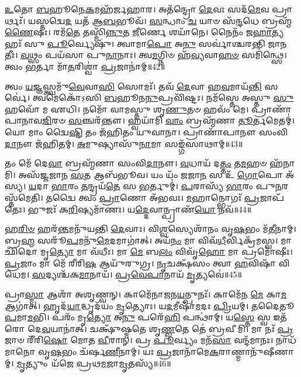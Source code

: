 \-\ul{𑌉}\-𑌤𑍋 \ul{𑌬}\-𑌹𑍂𑌨𑍇\-\ul{𑌕}\-𑌮𑌹᳴𑌰𑍍𑌜𑌹𑌾𑌰। 
𑌅𑌤᳴𑌨𑍍𑌦𑍍𑌰𑍋 \ul{𑌦𑍇}\-𑌵𑌃 𑌸𑌦᳴\-\ul{𑌮𑍇}\-𑌵 𑌪𑍍𑌰𑌾𑌰𑍍𑌥𑌃᳴। 
𑌯𑌸𑍍𑌤𑌦𑍍𑌵𑍇\-\ul{𑌦} 𑌯𑌤᳴ 𑌆\-\ul{𑌬}\-𑌭𑍂𑌵᳴। 
\-\ul{𑌸}\-𑌨𑍍𑌧𑌾𑌂 \ul{𑌚} 𑌯𑌾𑍞 𑌸᳴\-\ul{𑌨𑍍𑌦}\-𑌧𑍇 𑌬𑍍𑌰𑌹𑍍𑌮᳴\-\ul{𑌣𑍈}\-𑌷𑌃। 
𑌰𑌮᳴\-\ul{𑌤𑍇} 𑌤𑌸𑍍𑌮𑌿᳴\-\ul{𑌨𑍍𑌨𑍁}\-𑌤 \ul{𑌜𑍀}\-𑌰𑍍𑌣𑍇 𑌶𑌯𑌾᳴𑌨𑍇। 
𑌨𑍈𑌨𑌂᳴ 𑌜\-\ul{𑌹𑌾}\-𑌤𑍍𑌯𑌹𑌃᳴ 𑌸𑍁 \ul{𑌪𑍂}\-𑌰𑍍𑌵𑍍𑌯𑍇𑌷𑍁᳴। 
𑌤𑍍𑌵𑌾𑌮𑌾\-\ul{𑌪𑍋} 𑌅\-\ul{𑌨𑍁} 𑌸𑌰𑍍𑌵𑌾॑𑌶𑍍𑌚𑌰𑌨𑍍𑌤𑌿 𑌜𑌾\-\ul{𑌨}\-𑌤𑍀𑌃। 
\-\ul{𑌵}\-𑌥𑍍𑌸𑌂 𑌪𑌯᳴𑌸𑌾 𑌪𑍁\-\ul{𑌨𑌾}\-𑌨𑌾𑌃। 
𑌤𑍍𑌵\-\ul{𑌮}\-𑌗𑍍𑌨𑌿𑍞 𑌹᳴\-\ul{𑌵𑍍𑌯}\-𑌵𑌾\-\ul{𑌹}\-\-\ul{𑍞} 𑌸𑌮𑌿॑𑌨𑍍𑌥𑍍𑌸𑍇। 
𑌤𑍍𑌵𑌂 \ul{𑌭}\-𑌰𑍍𑌤𑌾 𑌮𑌾᳴\-\ul{𑌤}\-𑌰𑌿𑌶𑍍𑌵𑌾॑ \ul{𑌪𑍍𑌰}\-𑌜𑌾𑌨𑌾॑𑌮𑍍॥42॥

𑌤𑍍𑌵𑌂 \ul{𑌯}\-𑌜𑍍𑌞𑌸𑍍𑌤𑍍𑌵𑌮𑍁᳴\-\ul{𑌵𑍇}\-𑌵𑌾\-\ul{𑌸𑌿} 𑌸𑍋𑌮𑌃᳴। 
𑌤𑌵᳴ \ul{𑌦𑍇}\-𑌵𑌾 𑌹\-\ul{𑌵}\-𑌮𑌾𑌯᳴\-\ul{𑌨𑍍𑌤𑌿} 𑌸𑌰𑍍𑌵𑍇॑। 
𑌤𑍍𑌵𑌮𑍇𑌕𑍋᳴𑌽𑌸𑌿 \ul{𑌬}\-𑌹𑍂𑌨\-\ul{𑌨𑍁}\-𑌪𑍍𑌰𑌵𑌿᳴𑌷𑍍𑌟𑌃। 
𑌨𑌮᳴𑌸𑍍𑌤𑍇 𑌅𑌸𑍍𑌤𑍁 \ul{𑌸𑍁}\-𑌹𑌵𑍋᳴ 𑌮 𑌏𑌧𑌿। 
𑌨𑌮𑍋᳴ 𑌵𑌾𑌮𑌸𑍍𑌤𑍁 𑌶𑍃\-\ul{𑌣𑍁}\-𑌤𑍞 𑌹𑌵𑌂᳴ 𑌮𑍇। 
𑌪𑍍𑌰𑌾𑌣𑌾᳴𑌪𑌾𑌨𑌾𑌵\-\ul{𑌜𑌿}\-𑌰𑍞 \ul{𑌸}\-𑌞𑍍𑌚𑌰᳴𑌨𑍍𑌤𑍗। 
𑌹𑍍𑌵𑌯𑌾᳴𑌮𑌿 \ul{𑌵𑌾𑌂} 𑌬𑍍𑌰𑌹𑍍𑌮᳴𑌣𑌾 \ul{𑌤𑍂}\-𑌰𑍍𑌤𑌮𑍇𑌤𑌮𑍍॑। 
𑌯𑍋 𑌮𑌾𑌂 𑌦𑍍𑌵𑍇𑍇\-\ul{𑌷𑍍𑌟𑌿} 𑌤𑌂 𑌜᳴𑌹𑌿𑌤𑌂 𑌯𑍁𑌵𑌾𑌨𑌾। 
𑌪𑍍𑌰𑌾𑌣𑌾᳴𑌪𑌾𑌨𑍗 𑌸𑌂𑌵𑌿\-\ul{𑌦𑌾}\-𑌨𑍗 𑌜᳴𑌹𑌿𑌤𑌮𑍍। 
\-\ul{𑌅}\-𑌮𑍁𑌷𑍍𑌯𑌾𑌸𑍁᳴\-\ul{𑌨𑌾}\-𑌮𑌾 𑌸𑌙𑍍𑌗᳴𑌸𑌾𑌥𑌾𑌮𑍍॥43॥

𑌤𑌂 𑌮𑍇᳴ 𑌦𑍇\-\ul{𑌵𑌾} 𑌬𑍍𑌰𑌹𑍍𑌮᳴𑌣𑌾 𑌸𑌂𑌵𑌿\-\ul{𑌦𑌾}\-𑌨𑍗। 
\-\ul{𑌵}\-𑌧𑌾𑌯᳴ 𑌦\-\ul{𑌤𑍍𑌤𑌂} 𑌤\-\ul{𑌮}\-𑌹𑍞 𑌹᳴𑌨𑌾𑌮𑌿। 
𑌅𑌸᳴𑌜𑍍𑌜𑌜𑌾𑌨 \ul{𑌸}\-𑌤 𑌆𑌬᳴𑌭𑍂𑌵। 
𑌯𑌂 𑌯𑌂᳴ \ul{𑌜}\-𑌜𑌾\-\ul{𑌨} 𑌸 𑌉᳴ \ul{𑌗𑍋}\-𑌪𑍋 𑌅᳴𑌸𑍍𑌯। 
\-\ul{𑌯}\-𑌦𑌾 \ul{𑌭𑌾}\-𑌰𑌂 \ul{𑌤}\-𑌨𑍍𑌦𑍍𑌰𑌯᳴\-\ul{𑌤𑍇} 𑌸 𑌭𑌰𑍍𑌤𑍁𑌮𑍍॑। 
\-\ul{𑌪}\-𑌰𑌾𑌸𑍍𑌯᳴ \ul{𑌭𑌾}\-𑌰𑌂 𑌪𑍁\-\ul{𑌨}\-𑌰𑌸𑍍𑌤᳴𑌮𑍇𑌤𑌿। 
𑌤𑌦𑍍𑌵𑍈 𑌤𑍍𑌵𑌂 \ul{𑌪𑍍𑌰𑌾}\-𑌣𑍋 𑌅᳴𑌭𑌵𑌃। 
\-\ul{𑌮}\-𑌹𑌾𑌨𑍍𑌭𑍋𑌗𑌃᳴ \ul{𑌪𑍍𑌰}\-𑌜𑌾𑌪᳴𑌤𑍇𑌃। 
𑌭𑍁𑌜𑌃᳴ 𑌕\-\ul{𑌰𑌿}\-𑌷𑍍𑌯𑌮𑌾᳴𑌣𑌃। 
𑌯\-\ul{𑌦𑍍𑌦𑍇}\-𑌵𑌾𑌨𑍍𑌪𑍍𑌰𑌾𑌣᳴\-\ul{𑌯𑍋} 𑌨𑌵᳴॥44॥
\anuvakamend[𑌏𑌕𑌂᳴ \ul{𑌪𑍍𑌰}\-𑌜𑌾𑌨𑌾॑𑌙𑍍𑌗𑌸𑌾\-\ul{𑌥𑌾𑌂} 𑌨𑌵᳴]

𑌹\-\ul{𑌰𑌿}\-\-\ul{𑍞} 𑌹𑌰᳴\-\ul{𑌨𑍍𑌤}\-𑌮𑌨𑍁᳴𑌯𑌨𑍍𑌤𑌿 \ul{𑌦𑍇}\-𑌵𑌾𑌃। 
𑌵𑌿\-\ul{𑌶𑍍𑌵}\-𑌸𑍍𑌯𑍇𑌶𑌾᳴𑌨𑌂 𑌵𑍃\-\ul{𑌷}\-𑌭𑌂 𑌮᳴\-\ul{𑌤𑍀}\-𑌨𑌾𑌮𑍍। 
𑌬𑍍𑌰\-\ul{𑌹𑍍𑌮} 𑌸𑌰𑍂᳴\-\ul{𑌪}\-𑌮𑌨𑍁᳴\-\ul{𑌮𑍇}\-𑌦𑌮𑌾𑌗𑌾॑𑌤𑍍। 
𑌅𑌯᳴\-\ul{𑌨𑌂} 𑌮𑌾 𑌵𑌿𑌵᳴\-\ul{𑌧𑍀}\-𑌰𑍍𑌵𑌿𑌕𑍍𑌰᳴𑌮𑌸𑍍𑌵। 
𑌮𑌾 𑌛𑌿᳴𑌦𑍋 𑌮𑍃\-\ul{𑌤𑍍𑌯𑍋} 𑌮𑌾 𑌵᳴𑌧𑍀𑌃। 
𑌮𑌾 \ul{𑌮𑍇} 𑌬\-\ul{𑌲𑌂}  𑌵𑌿𑌵𑍃᳴\-\ul{𑌹𑍋} 𑌮𑌾 𑌪𑍍𑌰𑌮𑍋᳴𑌷𑍀𑌃। 
\-\ul{𑌪𑍍𑌰}\-𑌜𑌾𑌂 𑌮𑌾 𑌮𑍇᳴ 𑌰𑍀𑌰𑌿\-\ul{𑌷} 𑌆𑌯𑍁᳴𑌰𑍁𑌗𑍍𑌰। 
\-\ul{𑌨𑍃}\-𑌚𑌕𑍍𑌷᳴𑌸𑌂 𑌤𑍍𑌵𑌾 \ul{𑌹}\-𑌵𑌿𑌷𑌾᳴ 𑌵𑌿𑌧𑍇𑌮। 
\-\ul{𑌸}\-𑌦𑍍𑌯𑌶𑍍𑌚᳴𑌕\-\ul{𑌮𑌾}\-𑌨𑌾𑌯᳴। 
\-\ul{𑌪𑍍𑌰}\-\-\ul{𑌵𑍇}\-\-\ul{𑌪𑌾}\-𑌨𑌾𑌯᳴ \ul{𑌮𑍃}\-𑌤𑍍𑌯𑌵𑍇॑॥45॥

𑌪𑍍𑌰𑌾\-\ul{𑌸𑍍𑌮𑌾} 𑌆𑌶𑌾᳴ 𑌅𑌶𑍃𑌣𑍍𑌵𑌨𑍍। 
𑌕𑌾𑌮𑍇᳴𑌨𑌾𑌜𑌨\-\ul{𑌯}\-𑌨𑍍𑌪𑍁𑌨𑌃᳴। 
𑌕𑌾𑌮𑍇᳴𑌨 \ul{𑌮𑍇} 𑌕𑌾\-\ul{𑌮} 𑌆𑌗𑌾॑𑌤𑍍। 
𑌹𑍃𑌦᳴\-\ul{𑌯𑌾}\-𑌦𑍍𑌧𑍃𑌦᳴𑌯𑌂 \ul{𑌮𑍃}\-𑌤𑍍𑌯𑍋𑌃। 
𑌯\-\ul{𑌦}\-𑌮𑍀𑌷𑌾᳴\-\ul{𑌮}\-𑌦𑌃 \ul{𑌪𑍍𑌰𑌿}\-𑌯𑌮𑍍। 
𑌤𑌦𑍈𑌤𑍂\-\ul{𑌪}\-𑌮𑌾\-\ul{𑌮}\-𑌭𑌿। 
𑌪𑌰𑌂᳴ 𑌮𑍃\-\ul{𑌤𑍍𑌯𑍋} 𑌅\-\ul{𑌨𑍁} 𑌪𑌰𑍇᳴\-\ul{𑌹𑌿} 𑌪𑌨𑍍𑌥𑌾॑𑌮𑍍। 
𑌯\-\ul{𑌸𑍍𑌤𑍇} 𑌸𑍍𑌵 𑌇𑌤᳴𑌰𑍋 𑌦𑍇\-\ul{𑌵}\-𑌯𑌾𑌨𑌾॑𑌤𑍍। 
𑌚𑌕𑍍𑌷𑍁᳴𑌷𑍍𑌮𑌤𑍇 𑌶𑍃\-\ul{𑌣𑍍𑌵}\-𑌤𑍇 𑌤𑍇॑ 𑌬𑍍𑌰𑌵𑍀𑌮𑌿। 
𑌮𑌾 𑌨𑌃᳴ \ul{𑌪𑍍𑌰}\-𑌜𑌾𑍞 𑌰𑍀᳴𑌰𑌿\-\ul{𑌷𑍋} 𑌮𑍋𑌤 \ul{𑌵𑍀}\-𑌰𑌾𑌨𑍍। 
𑌪𑍍𑌰 \ul{𑌪𑍂}\-𑌰𑍍𑌵𑍍𑌯𑌂 𑌮𑌨᳴\-\ul{𑌸𑌾} 𑌵𑌨𑍍𑌦᳴𑌮𑌾𑌨𑌃। 
𑌨𑌾𑌧᳴𑌮𑌾𑌨𑍋 𑌵𑍃\-\ul{𑌷}\-𑌭𑌂 𑌚᳴𑌰𑍍\mbox{}𑌷\-\ul{𑌣𑍀}\-𑌨𑌾𑌮𑍍। 
𑌯𑌃 \ul{𑌪𑍍𑌰}\-𑌜𑌾𑌨𑌾᳴𑌮𑍇\-\ul{𑌕}\-𑌰𑌾𑌣𑍍𑌮𑌾𑌨𑍁᳴𑌷𑍀𑌣𑌾𑌮𑍍। 
\-\ul{𑌮𑍃}\-𑌤𑍍𑌯𑍁𑌂 𑌯᳴𑌜𑍇 𑌪𑍍𑌰𑌥\-\ul{𑌮}\-𑌜𑌾\-\ul{𑌮𑍃}\-𑌤𑌸𑍍𑌯᳴॥46॥
\anuvakamend[\-\ul{𑌮𑍃}\-𑌤𑍍𑌯𑌵𑍇᳴ \ul{𑌵𑍀}\-𑌰𑌾𑍞\-\ul{𑌶𑍍𑌚}\-𑌤𑍍𑌵𑌾𑌰𑌿᳴ 𑌚]

